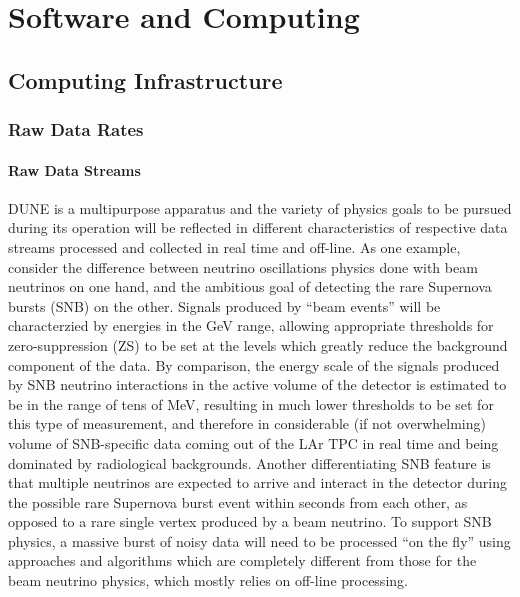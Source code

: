 \chapter{Software and Computing}
\label{ch:detectors-sc}

\section{Computing Infrastructure}
\label{sec:detectors-sc-infrastructure}

\subsection{Raw Data Rates}
\label{sec:detectors-sc-infrastructure-data-rates}


\subsubsection{Raw Data Streams}
DUNE is a multipurpose apparatus and the variety of physics goals to be pursued during its operation will
be reflected in different characteristics of respective data streams processed and collected in real time and off-line.
As one example, consider the difference between neutrino oscillations physics done with beam neutrinos on one hand,
and the ambitious goal of detecting the rare Supernova bursts (SNB) on the other. Signals produced by ``beam events'' will
be characterzied by energies in the GeV range, allowing appropriate thresholds for zero-suppression (ZS) to be
set at the levels which greatly reduce the background component of the data. By comparison, the energy scale of
the signals produced by SNB neutrino interactions in the active volume of the detector is estimated to be in the range of tens of MeV, resulting
in much lower thresholds to be set for this type of measurement, and therefore in considerable (if not overwhelming) volume of SNB-specific data coming
out of the LAr TPC in real time and being dominated by radiological backgrounds. Another differentiating SNB feature is that multiple neutrinos are expected
to arrive and interact in the detector during the possible rare Supernova burst event within seconds from each other, as opposed to a rare single vertex produced by a beam neutrino.
To support SNB physics, a massive burst of noisy data will need to be processed ``on the fly'' using approaches and
algorithms which are completely  different from those for the beam neutrino physics, which mostly relies on off-line processing.

